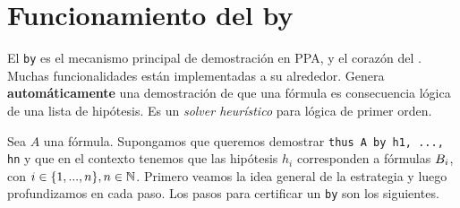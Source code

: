 \section{Funcionamiento del by}

El \lstinline{by} es el mecanismo principal de demostración en PPA, y el corazón
del \modCertifier. Muchas funcionalidades están implementadas a su alrededor.
Genera \textbf{automáticamente} una demostración de que una fórmula es
consecuencia lógica de una lista de hipótesis. Es un \textit{solver heurístico} para lógica de primer orden.

Sea $A$ una fórmula. Supongamos que queremos demostrar \lstinline{thus A by h1, ..., hn} y que en el contexto tenemos que las hipótesis $h_i$ corresponden a
fórmulas $B_i$, con $i \in \{1, ..., n\}, n \in \mathbb{N}$. Primero
veamos la idea general de la estrategia y luego profundizamos en cada paso. Los pasos para certificar un \lstinline{by} son los siguientes. 
